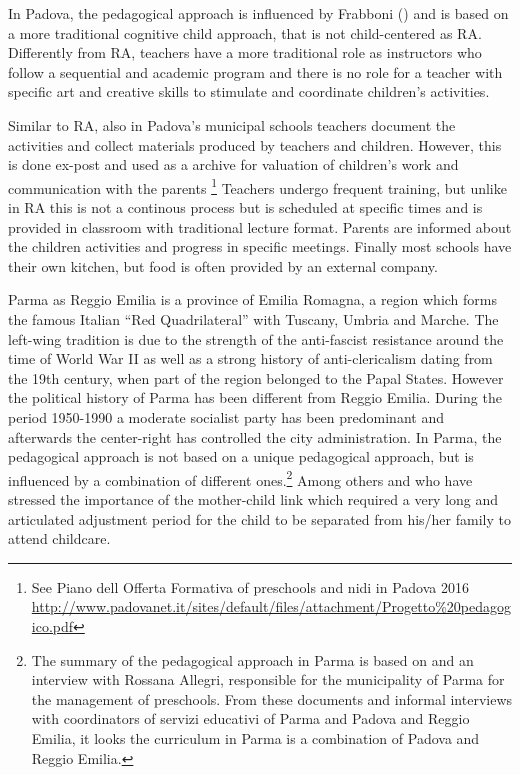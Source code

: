 \documentclass[12pt]{article}
\begin{document}
In Padova, the pedagogical approach is influenced by Frabboni (\cite{Frabboni1999}) and is based on a more traditional cognitive child approach, that is not child-centered as RA. Differently from RA, teachers have a more traditional role as instructors who follow a sequential and academic program and there is no role for a teacher with specific art and creative skills to stimulate and coordinate children's activities.

Similar to RA, also in Padova's municipal schools teachers document the activities and collect materials produced by teachers and children. However, this is done ex-post and used as a archive for valuation of children's work and communication with the parents \footnote{See Piano dell Offerta Formativa of preschools and nidi in Padova 2016 \url{http://www.padovanet.it/sites/default/files/attachment/Progetto\%20pedagogico.pdf}} Teachers undergo frequent training, but unlike in RA this is not a continous process but is scheduled at specific times and is provided in classroom with traditional lecture format. Parents are informed about the children activities and progress in specific meetings. Finally most schools have their own kitchen, but food is often provided by an external company.

Parma as Reggio Emilia is a province of Emilia Romagna, a region which forms the famous Italian ``Red Quadrilateral'' with Tuscany, Umbria and Marche. The left-wing tradition is due to the strength of the anti-fascist resistance around the time of World War II as well as a strong history of anti-clericalism dating from the 19th century, when part of the region belonged to the Papal States. However the political history of Parma has been different from Reggio Emilia. During the period 1950-1990 a moderate socialist party has been predominant and afterwards the center-right has controlled the city administration. In Parma, the pedagogical approach is not based on a unique pedagogical approach, but is influenced by a combination of different ones.\footnote{The summary of the pedagogical approach in Parma is based on \cite{Parma2006} and an interview with Rossana Allegri, responsible for the municipality of Parma for the management of preschools. From these documents and informal interviews with coordinators of servizi educativi of Parma and Padova and Reggio Emilia, it looks the curriculum in Parma is a combination of Padova and Reggio Emilia.} Among others \cite{Winnicott1965} and \cite{Bion1962} who have stressed the importance of the mother-child link which required a very long and articulated adjustment period for the child to be separated from his/her family to attend childcare.
\end{document}
